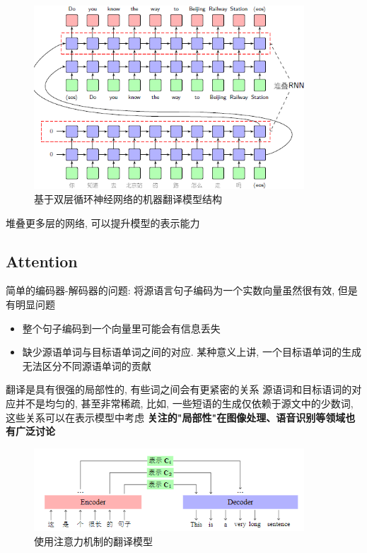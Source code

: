 \documentclass[a4paper]{article}
\theoremstyle{definition}
\numberwithin{equation}{section}
\begin{document}
\begin{figure}[htp]
    \centering
    \includegraphics[width=0.9\textwidth]{multiNet_NML.png}
    \caption{基于双层循环神经网络的机器翻译模型结构}
    \end{figure}
 堆叠更多层的网络, 可以提升模型的表示能力
 
\subsection{Attention}

简单的编码器-解码器的问题:
将源语言句子编码为一个实数向量虽然很有效, 但是有明显问题
\begin{itemize}
    \item 
    整个句子编码到一个向量里可能会有信息丢失
    \item 
    缺少源语单词与目标语单词之间的对应. 某种意义上讲, 一个目标语单词的生成无法区分不同源语单词的贡献
\end{itemize}
翻译是具有很强的局部性的, 有些词之间会有更紧密的关系
源语词和目标语词的对应并不是均匀的, 甚至非常稀疏, 比如, 一些短语的生成仅依赖于源文中的少数词, 这些关系可以在表示模型中考虑
\textbf{关注的"局部性"在图像处理、语音识别等领域也有广泛讨论}
\begin{figure}[htp]
    \centering
    \includegraphics[width=0.9\textwidth]{attention1.png}
    \caption{使用注意力机制的翻译模型}
    \end{figure}
\end{document}
